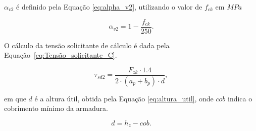 $\alpha_{v2}$ é definido pela Equação \eqref{eq:alpha_v2}, utilizando o valor de $f_{ck}$ em $MPa$

\begin{equation}
    \alpha_{v2} =  1 - \frac{f_{ck}}{250}.
        \label{eq:alpha_v2}
\end{equation}

 O cálculo da tensão solicitante de cálculo é dada pela Equação~\eqref{eq:Tensão_solicitante_C}.

\begin{equation}
 \tau_{sd2} = \frac{F_{zk} \cdot 1.4}{2 \cdot (a_p + b_p) \cdot d},
     \label{eq:Tensão_solicitante_C}
\end{equation}


em que $d$ é a altura útil, obtida pela Equação \eqref{eq:altura_util}, onde $cob$ indica o cobrimento mínimo da armadura.

\begin{equation}
    d = h_z - cob.
    \label{eq:altura_util}
\end{equation}










